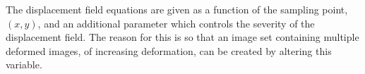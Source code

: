 \documentclass[12pt,oneside,openany,a4paper, %
english, %
masters-t, goldenblock]{usthesis}
\begin{document}
The displacement field equations are given as a function of the sampling point, $(x,y)$, and an additional parameter which controls the severity of the displacement field. The reason for this is so that an image set containing multiple deformed images, of increasing deformation, can be created by altering this variable.


\end{document}
